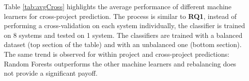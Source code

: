 \begin{table}[t]
	\caption{Average performance of different machine learners for cross-project prediction.}
	\label{tab:avgCross}
	\centering\tiny
	\vspace{-3mm}
\end{table}

Table \ref{tab:avgCross} highlights the average performance of different machine learners for cross-project prediction. The process is similar to \textbf{RQ1}, instead of performing a cross-validation on each system individually, the classifier is trained on 8 systems and tested on 1 system. The classifiers are trained with a balanced dataset (top section of the table) and with an unbalanced one (bottom section). The same trend is observed for within project and cross-project predictions: Random Forests outperforms the other machine learners and rebalancing does not provide a significant payoff. 


